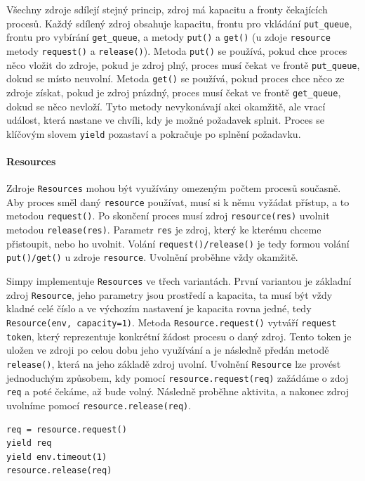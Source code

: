 \documentclass[
  program=itp,
  biblatex,
  figures=false,
  glossaries,
  index
]{kidiplom}
\begin{document}
Všechny zdroje sdílejí stejný princip, zdroj má kapacitu a fronty čekajících procesů. Každý sdílený zdroj obsahuje kapacitu, frontu pro vkládání \texttt{put\_queue}, frontu pro vybírání \texttt{get\_queue}, a metody \texttt{put()} a \texttt{get()} (u zdoje \texttt{resource} metody \texttt{request()} a \texttt{release()}). Metoda \texttt{put()} se používá, pokud chce proces něco vložit do zdroje, pokud je zdroj plný, proces musí čekat ve frontě \texttt{put\_queue}, dokud se místo neuvolní. Metoda \texttt{get()} se používá, pokud proces chce něco ze zdroje získat, pokud je zdroj prázdný, proces musí čekat ve frontě \texttt{get\_queue}, dokud se něco nevloží. Tyto metody nevykonávají akci okamžitě, ale vrací událost, která nastane ve chvíli, kdy je možné požadavek splnit. Proces se klíčovým slovem \texttt{yield} pozastaví a pokračuje po splnění požadavku.

\paragraph{Resources}
Zdroje \texttt{Resources} mohou být využívány omezeným počtem procesů současně. Aby proces směl daný \texttt{resource} používat, musí si k němu vyžádat přístup, a to metodou \texttt{request()}. Po skončení proces musí zdroj \texttt{resource(res)} uvolnit metodou \texttt{release(res)}. Parametr \texttt{res} je zdroj, který ke kterému chceme přistoupit, nebo ho uvolnit. Volání \texttt{request()/release()} je tedy formou volání \texttt{put()/get()} u zdroje \texttt{resource}. Uvolnění proběhne vždy okamžitě. 

Simpy implementuje \texttt{Resources} ve třech variantách. První variantou je základní zdroj \texttt{Resource}, jeho parametry jsou prostředí a kapacita, ta musí být vždy kladné celé číslo a ve výchozím nastavení je kapacita rovna jedné, tedy \texttt{Resource(env, capacity=1)}. Metoda \texttt{Resource.request()} vytváří \texttt{request token}, který reprezentuje konkrétní žádost procesu o daný zdroj. Tento token je uložen ve zdroji po celou dobu jeho využívání a je následně předán metodě \texttt{release()}, která na jeho základě zdroj uvolní.  Uvolnění \texttt{Resource} lze provést jednoduchým způsobem, kdy pomocí \texttt{resource.request(req)} zažádáme o zdoj \texttt{req} a poté čekáme, až bude volný. Následně proběhne aktivita, a nakonec zdroj uvolníme pomocí \texttt{resource.release(req)}.

\begin{verbatim}
req = resource.request()  
yield req              
yield env.timeout(1)
resource.release(req)      
\end{verbatim}
\end{document}
